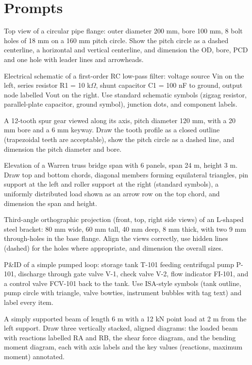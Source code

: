 \documentclass[11pt,a4paper]{article}
\begin{document}
\section{Prompts}
\begin{description}[style=nextline,leftmargin=1em]
\item[\texttt{flange\_bolt\_circle}] Top view of a circular pipe flange: outer diameter 200 mm, bore 100 mm, 8 bolt holes of 18 mm on a 160 mm pitch circle. Show the pitch circle as a dashed centerline, a horizontal and vertical centerline, and dimension the OD, bore, PCD and one hole with leader lines and arrowheads.
\item[\texttt{rc\_lowpass\_schematic}] Electrical schematic of a first-order RC low-pass filter: voltage source Vin on the left, series resistor R1 = 10 k$\Omega$, shunt capacitor C1 = 100 nF to ground, output node labelled Vout on the right. Use standard schematic symbols (zigzag resistor, parallel-plate capacitor, ground symbol), junction dots, and component labels.
\item[\texttt{spur\_gear\_12t}] A 12-tooth spur gear viewed along its axis, pitch diameter 120 mm, with a 20 mm bore and a 6 mm keyway. Draw the tooth profile as a closed outline (trapezoidal teeth are acceptable), show the pitch circle as a dashed line, and dimension the pitch diameter and bore.
\item[\texttt{warren\_truss}] Elevation of a Warren truss bridge span with 6 panels, span 24 m, height 3 m. Draw top and bottom chords, diagonal members forming equilateral triangles, pin support at the left and roller support at the right (standard symbols), a uniformly distributed load shown as an arrow row on the top chord, and dimension the span and height.
\item[\texttt{bracket\_three\_view}] Third-angle orthographic projection (front, top, right side views) of an L-shaped steel bracket: 80 mm wide, 60 mm tall, 40 mm deep, 8 mm thick, with two 9 mm through-holes in the base flange. Align the views correctly, use hidden lines (dashed) for the holes where appropriate, and dimension the overall sizes.
\item[\texttt{pid\_pump\_loop}] P\&ID of a simple pumped loop: storage tank T-101 feeding centrifugal pump P-101, discharge through gate valve V-1, check valve V-2, flow indicator FI-101, and a control valve FCV-101 back to the tank. Use ISA-style symbols (tank outline, pump circle with triangle, valve bowties, instrument bubbles with tag text) and label every item.
\item[\texttt{beam\_shear\_moment}] A simply supported beam of length 6 m with a 12 kN point load at 2 m from the left support. Draw three vertically stacked, aligned diagrams: the loaded beam with reactions labelled RA and RB, the shear force diagram, and the bending moment diagram, each with axis labels and the key values (reactions, maximum moment) annotated.

\end{description}
\end{document}
